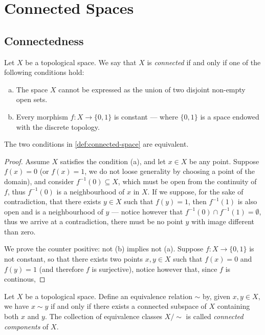 \section{Connected Spaces}

\subsection{Connectedness}

\begin{definition}
\label{def:connected-space}
Let \(X\) be a topological space. We say that \(X\) is \emph{connected} if and
only if one of the following conditions hold:
\begin{enumerate}[(a)]\setlength\itemsep{0em}
\item The space \(X\) cannot be expressed as the union of two disjoint non-empty
open sets.
\item Every morphism \(f: X \to \{0, 1\}\) is constant --- where \(\{0, 1\}\) is
a space endowed with the discrete topology.
\end{enumerate}
\end{definition}

\begin{corollary}
The two conditions in \cref{def:connected-space} are equivalent.
\end{corollary}

\begin{proof}
Assume \(X\) satisfies the condition (a), and let \(x \in X\) be any
point. Suppose \(f(x) = 0\) (or \(f(x) = 1\), we do not loose generality by
choosing a point of the domain), and consider \(f^{-1}(0) \subseteq X\), which
must be open from the continuity of \(f\), thus \(f^{-1}(0)\) is a neighbourhood
of \(x\) in \(X\). If we suppose, for the sake of contradiction, that there
exists \(y \in X\) such that \(f(y) = 1\), then \(f^{-1}(1)\) is also open and
is a neighbourhood of \(y\) --- notice however that \(f^{-1}(0) \cap f^{-1}(1) =
\emptyset\), thus we arrive at a contradiction, there must be no point \(y\)
with image different than zero.

We prove the counter positive: not (b) implies not (a). Suppose \(f: X
\to \{0, 1\}\) is not constant, so that there exists two points \(x, y \in X\)
such that \(f(x) = 0\) and \(f(y) = 1\) (and therefore \(f\) is surjective),
notice however that, since \(f\) is continous,
\end{proof}

\begin{definition}
\label{def:connected-components}
Let \(X\) be a topological space. Define an equivalence relation \(\sim\) by,
given \(x, y \in X\), we have \(x \sim y\) if and only if there exists a
connected subspace of \(X\) containing both \(x\) and \(y\). The collection of
equivalence classes \(X/{\sim}\) is called \emph{connected components} of \(X\).
\end{definition}


